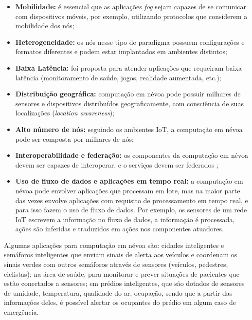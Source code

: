 \begin{itemize}

    \item \textbf{Mobilidade:} é essencial que as aplicações \emph{fog} sejam
    capazes de se comunicar com dispositivos móveis, por exemplo, utilizando
    protocolos que considerem a mobilidade dos nós;

    \item \textbf{Heterogeneidade:} os nós nesse tipo de paradigma possuem
    configurações e formatos diferentes e podem estar implantados em ambientes
    distintos;

    \item \textbf{Baixa Latência:}  foi proposta para
    atender aplicações que requeiram baixa latência (monitoramento de saúde,
    jogos, realidade aumentada, etc.);

    \item \textbf{Distribuição geográfica:} computação em névoa pode possuir
    milhares de sensores e dispositivos distribuídos geograficamente, com
    consciência de suas localizações (\emph{location awareness});

    \item \textbf{Alto número de nós:} seguindo os ambientes IoT, a computação
    em névoa pode ser composta por milhares de nós;

    \item \textbf{Interoperabilidade e federação:} os componentes da computação
    em névoa devem ser capazes de interoperar, e o serviços devem ser federados
    ;

    \item \textbf{Uso de fluxo de dados e aplicações em tempo real:} a
    computação em névoa pode envolver aplicações que processam em lote, mas na
    maior parte das vezes envolve aplicações com requisito de processamento em
    tempo real, e para isso fazem o uso de fluxo de dados. Por exemplo, os
    sensores de um rede IoT escrevem a informação no fluxo de dados, a
    informação é processada, ações são inferidas e traduzidos em
    ações nos componentes atuadores.

\end{itemize}

Algumas aplicações para computação em névoa são:
cidades inteligentes e
semáforos inteligentes que enviam sinais de alerta aos veículos e coordenam os
sinais verdes com outros semáforos através de sensores (veículos, pedestres,
ciclistas);
na área de saúde, para monitorar e prever situações de pacientes que
estão conectados a sensores;
em prédios inteligentes, que são dotados de sensores
de umidade, temperatura, qualidade do ar, ocupação, sendo que a partir das
informações deles, é possível alertar os ocupantes do prédio em algum caso de
emergência.

